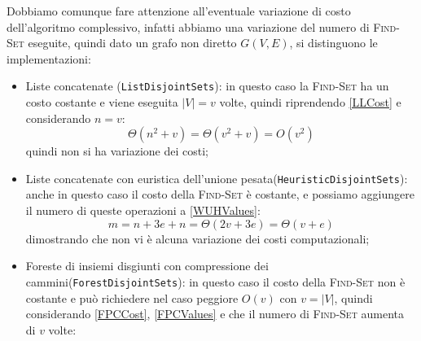 \begin{enumerate}
\begin{enumerate}[resume]
                        Dobbiamo comunque fare attenzione all'eventuale variazione di costo dell'algoritmo complessivo, infatti abbiamo
                        una variazione del numero di \textsc{Find-Set} eseguite, quindi dato un grafo non diretto $G(V,E)$, si distinguono le implementazioni:
                        \begin{itemize}
                              \item Liste concatenate (\texttt{ListDisjointSets}): in questo caso la \textsc{Find-Set} ha un costo costante
                                    e viene eseguita $|V| = v$ volte, quindi riprendendo \eqref{LLCost} e considerando $n = v$:
                                    \begin{equation}
                                          \Theta(n^2 + v) = \Theta(v^2 + v) = O(v^2)
                                    \end{equation}
                                    quindi non si ha variazione dei costi;
                              \item Liste concatenate con euristica dell'unione pesata\linebreak (\texttt{HeuristicDisjointSets}): anche in
                                    questo caso il costo della \textsc{Find-Set} è costante, e possiamo aggiungere il numero di queste
                                    operazioni a \eqref{WUHValues}:
                                    \begin{equation}
                                          m = n + 3e + n = \Theta(2v + 3e) = \Theta(v + e)
                                    \end{equation}
                                    dimostrando che non vi è alcuna variazione dei costi computazionali;
                              \item Foreste di insiemi disgiunti con compressione dei cammini\linebreak (\texttt{ForestDisjointSets}):
                                    in questo caso il costo della \textsc{Find-Set} non è costante e può richiedere nel caso peggiore
                                    $O(v)$ con $v = |V|$, quindi considerando \eqref{FPCCost}, \eqref{FPCValues} e che il numero di
                                    \textsc{Find-Set} aumenta di $v$ volte:
                                    \begin{equation}
                                          \label{NewFCCCost}
                                          \begin{aligned}

\end{aligned}
\end{equation}
\end{itemize}
\end{enumerate}
\end{enumerate}
